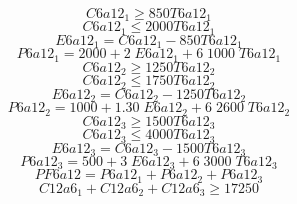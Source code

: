 \begin{equation}
C6a12_{1} \geq 850 T6a12_{1}
\end{equation}
\begin{equation}
C6a12_{1} \leq 2000 T6a12_{1}
\end{equation}
\begin{equation}
E6a12_{1} = C6a12_{1} - 850 T6a12_{1}
\end{equation}
\begin{equation}
P6a12_{1} = 2000 + 2 \; E6a12_{1} + 6 \; 1000 \; T6a12_{1}
\end{equation}
\begin{equation}
C6a12_{2} \geq 1250 T6a12_{2}
\end{equation}
\begin{equation}
C6a12_{2} \leq 1750 T6a12_{2}
\end{equation}
\begin{equation}
E6a12_{2} = C6a12_{2} - 1250 T6a12_{2}
\end{equation}
\begin{equation}
P6a12_{2} = 1000 + 1.30 \; E6a12_{2} + 6 \; 2600 \; T6a12_{2}
\end{equation}
\begin{equation}
C6a12_{3} \geq 1500 T6a12_{3}
\end{equation}
\begin{equation}
C6a12_{3} \leq 4000 T6a12_{3}
\end{equation}
\begin{equation}
E6a12_{3} = C6a12_{3} - 1500 T6a12_{3}
\end{equation}
\begin{equation}
P6a12_{3} = 500 + 3 \; E6a12_{3} + 6 \; 3000 \; T6a12_{3}
\end{equation}
\begin{equation}
PF6a12 = P6a12_{1} + P6a12_{2} + P6a12_{3}
\end{equation}
\begin{equation}
C12a6_{1} + C12a6_{2} + C12a6_{3} \geq 17250
\end{equation}
